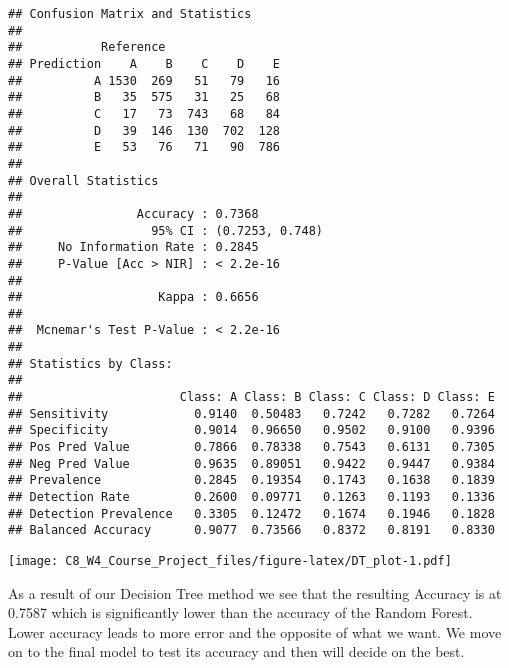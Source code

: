 \documentclass[]{article}
\newenvironment{Shaded}{\begin{snugshade}}{\end{snugshade}}
\newcommand{\KeywordTok}[1]{\textcolor[rgb]{0.13,0.29,0.53}{\textbf{#1}}}
\newcommand{\DataTypeTok}[1]{\textcolor[rgb]{0.13,0.29,0.53}{#1}}
\newcommand{\DecValTok}[1]{\textcolor[rgb]{0.00,0.00,0.81}{#1}}
\newcommand{\StringTok}[1]{\textcolor[rgb]{0.31,0.60,0.02}{#1}}
\newcommand{\CommentTok}[1]{\textcolor[rgb]{0.56,0.35,0.01}{\textit{#1}}}
\newcommand{\OperatorTok}[1]{\textcolor[rgb]{0.81,0.36,0.00}{\textbf{#1}}}
\newcommand{\NormalTok}[1]{#1}
\begin{document}
\begin{verbatim}
## Confusion Matrix and Statistics
## 
##           Reference
## Prediction    A    B    C    D    E
##          A 1530  269   51   79   16
##          B   35  575   31   25   68
##          C   17   73  743   68   84
##          D   39  146  130  702  128
##          E   53   76   71   90  786
## 
## Overall Statistics
##                                          
##                Accuracy : 0.7368         
##                  95% CI : (0.7253, 0.748)
##     No Information Rate : 0.2845         
##     P-Value [Acc > NIR] : < 2.2e-16      
##                                          
##                   Kappa : 0.6656         
##                                          
##  Mcnemar's Test P-Value : < 2.2e-16      
## 
## Statistics by Class:
## 
##                      Class: A Class: B Class: C Class: D Class: E
## Sensitivity            0.9140  0.50483   0.7242   0.7282   0.7264
## Specificity            0.9014  0.96650   0.9502   0.9100   0.9396
## Pos Pred Value         0.7866  0.78338   0.7543   0.6131   0.7305
## Neg Pred Value         0.9635  0.89051   0.9422   0.9447   0.9384
## Prevalence             0.2845  0.19354   0.1743   0.1638   0.1839
## Detection Rate         0.2600  0.09771   0.1263   0.1193   0.1336
## Detection Prevalence   0.3305  0.12472   0.1674   0.1946   0.1828
## Balanced Accuracy      0.9077  0.73566   0.8372   0.8191   0.8330
\end{verbatim}

\begin{Shaded}
\end{Shaded}

\texttt{[image: C8\_W4\_Course\_Project\_files/figure-latex/DT\_plot-1.pdf]}

As a result of our Decision Tree method we see that the resulting
Accuracy is at 0.7587 which is significantly lower than the accuracy of
the Random Forest. Lower accuracy leads to more error and the opposite
of what we want. We move on to the final model to test its accuracy and
then will decide on the best.
\end{document}
